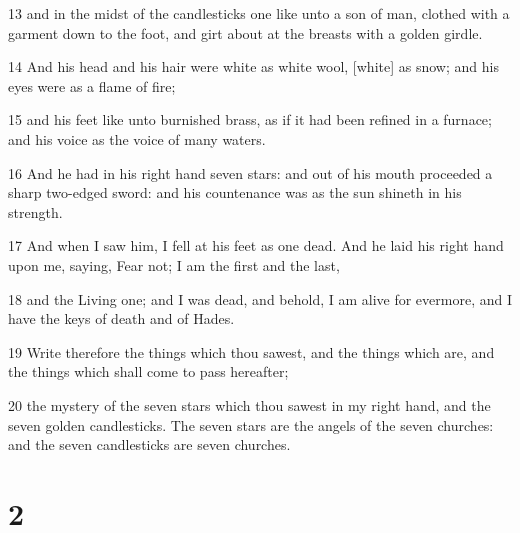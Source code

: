 \par 13 and in the midst of the candlesticks one like unto a son of man, clothed with a garment down to the foot, and girt about at the breasts with a golden girdle.
\par 14 And his head and his hair were white as white wool, [white] as snow; and his eyes were as a flame of fire;
\par 15 and his feet like unto burnished brass, as if it had been refined in a furnace; and his voice as the voice of many waters.
\par 16 And he had in his right hand seven stars: and out of his mouth proceeded a sharp two-edged sword: and his countenance was as the sun shineth in his strength.
\par 17 And when I saw him, I fell at his feet as one dead. And he laid his right hand upon me, saying, Fear not; I am the first and the last,
\par 18 and the Living one; and I was dead, and behold, I am alive for evermore, and I have the keys of death and of Hades.
\par 19 Write therefore the things which thou sawest, and the things which are, and the things which shall come to pass hereafter;
\par 20 the mystery of the seven stars which thou sawest in my right hand, and the seven golden candlesticks. The seven stars are the angels of the seven churches: and the seven candlesticks are seven churches.

\chapter{2}

